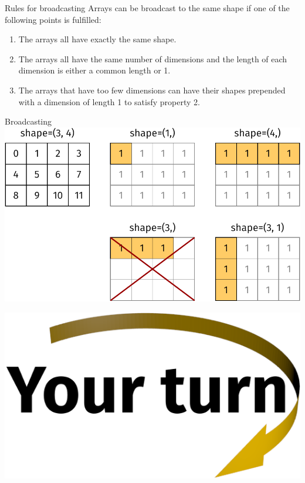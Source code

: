\documentclass[svgnames]{beamer}
\begin{document}
\begin{frame}{Rules for broadcasting}
 Arrays can be broadcast to the same shape if one of the following points is
 fulfilled:
 \begin{enumerate}
  \item The arrays all have exactly the same shape.
  \item The arrays all have the same number of dimensions and the
        length of each dimension is either a common length or 1.
  \item The arrays that have too few dimensions can have their
        shapes prepended with a dimension of length 1 to satisfy
        property 2.
 \end{enumerate}
\end{frame}

\begin{frame}{Broadcasting}
 \includegraphics[width=\textwidth]{broadcast}

 \vspace{-0.3truecm}
  \includegraphics[width=3truecm]{yourturn}
\end{frame}
\end{document}

